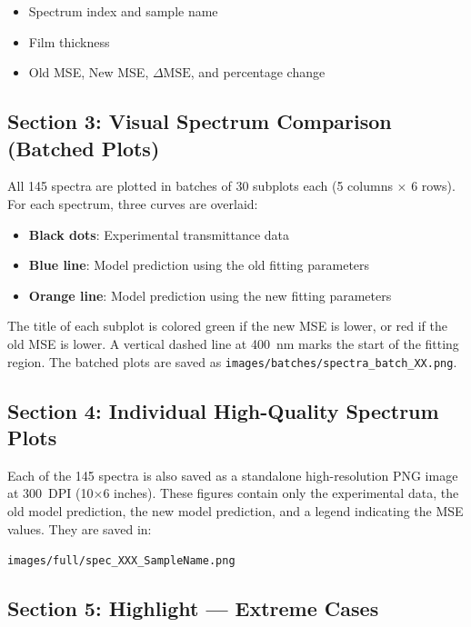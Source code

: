 \documentclass[12pt,a4paper]{article}
\begin{document}
\begin{itemize}[noitemsep]
    \item Spectrum index and sample name
    \item Film thickness
    \item Old MSE, New MSE, $\Delta\text{MSE}$, and percentage change
\end{itemize}

\subsection{Section 3: Visual Spectrum Comparison (Batched Plots)}

All 145 spectra are plotted in batches of 30 subplots each (5 columns $\times$ 6 rows). For each spectrum, three curves are overlaid:

\begin{itemize}[noitemsep]
    \item \textbf{Black dots}: Experimental transmittance data
    \item \textbf{Blue line}: Model prediction using the old fitting parameters
    \item \textbf{Orange line}: Model prediction using the new fitting parameters
\end{itemize}

The title of each subplot is colored green if the new MSE is lower, or red if the old MSE is lower. A vertical dashed line at 400~nm marks the start of the fitting region. The batched plots are saved as \texttt{images/batches/spectra\_batch\_XX.png}.

\subsection{Section 4: Individual High-Quality Spectrum Plots}

Each of the 145 spectra is also saved as a standalone high-resolution PNG image at 300~DPI (10$\times$6 inches). These figures contain only the experimental data, the old model prediction, the new model prediction, and a legend indicating the MSE values. They are saved in:

\begin{center}
\texttt{images/full/spec\_XXX\_SampleName.png}
\end{center}

\subsection{Section 5: Highlight --- Extreme Cases}
\end{document}
